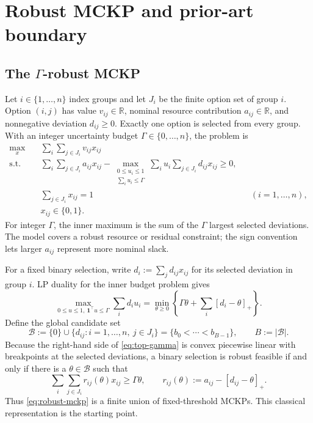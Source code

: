 \documentclass[11pt]{article}
\theoremstyle{plain}
\theoremstyle{definition}
\theoremstyle{remark}
\newcommand{\R}{\mathbb R}
\newcommand{\B}{\mathcal B}
\newcommand{\pos}[1]{[#1]_+}
\begin{document}
\section{Robust MCKP and prior-art boundary}\label{sec:problem}

\subsection{The \texorpdfstring{$\Gamma$}{Gamma}-robust MCKP}

Let $i\in\{1,\ldots,n\}$ index groups and let $J_i$ be the finite option set of group $i$.  Option $(i,j)$ has value $v_{ij}\in\R$, nominal resource contribution $a_{ij}\in\R$, and nonnegative deviation $d_{ij}\ge0$.  Exactly one option is selected from every group.  With an integer uncertainty budget $\Gamma\in\{0,\ldots,n\}$, the problem is
\begin{align}
\max_x\quad & \sum_i\sum_{j\in J_i}v_{ij}x_{ij} \label{eq:robust-mckp}\tag{R-MCKP}\\
\text{s.t.}\quad &
\sum_i\sum_{j\in J_i}a_{ij}x_{ij}
-\max_{\substack{0\le u_i\le1\\\sum_i u_i\le\Gamma}}
\sum_i u_i\sum_{j\in J_i}d_{ij}x_{ij}\ge0,\nonumber\\
&\sum_{j\in J_i}x_{ij}=1 &&(i=1,\ldots,n),\nonumber\\
&x_{ij}\in\{0,1\}.\nonumber
\end{align}
For integer $\Gamma$, the inner maximum is the sum of the $\Gamma$ largest selected deviations.  The model covers a robust resource or residual constraint; the sign convention lets larger $a_{ij}$ represent more nominal slack.

For a fixed binary selection, write $d_i:=\sum_jd_{ij}x_{ij}$ for its selected deviation in group $i$.  LP duality for the inner budget problem gives
\begin{equation}\label{eq:top-gamma}
\max_{0\le u\le1,\ \mathbf 1^\top u\le\Gamma}\sum_i d_i u_i
=\min_{\theta\ge0}\left\{\Gamma\theta+\sum_i\pos{d_i-\theta}\right\}.
\end{equation}
Define the global candidate set
\[
\B:=\{0\}\cup\{d_{ij}:i=1,\ldots,n,\ j\in J_i\}
=\{b_0<\cdots<b_{B-1}\},\qquad B:=|\B|.
\]
Because the right-hand side of \eqref{eq:top-gamma} is convex piecewise linear with breakpoints at the selected deviations, a binary selection is robust feasible if and only if there is a $\theta\in\B$ such that
\begin{equation}\label{eq:fixed-threshold-feasibility}
\sum_i\sum_{j\in J_i}r_{ij}(\theta)x_{ij}\ge\Gamma\theta,
\qquad
r_{ij}(\theta):=a_{ij}-\pos{d_{ij}-\theta}.
\end{equation}
Thus \eqref{eq:robust-mckp} is a finite union of fixed-threshold MCKPs.  This classical representation is the starting point.
\end{document}
